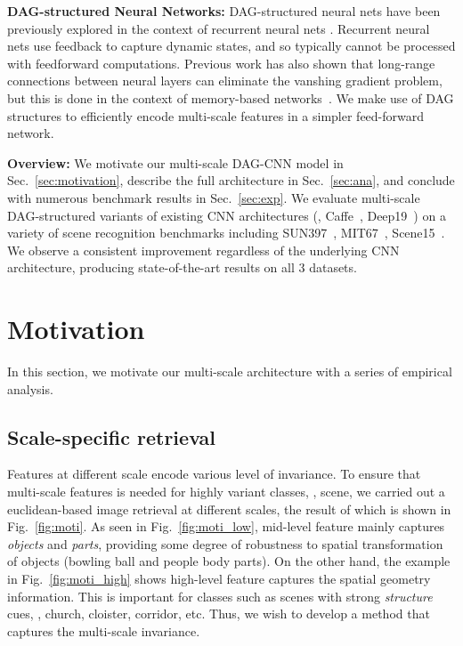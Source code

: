 \documentclass[10pt,twocolumn,letterpaper]{article}
\begin{document}
{\bf DAG-structured Neural Networks:} DAG-structured neural nets have been previously explored in the context of recurrent neural nets \cite{baldi2003principled,graves2009offline}. Recurrent neural nets use feedback to capture dynamic states, and so typically cannot be processed with feedforward computations. Previous work has also shown that long-range connections between neural layers can eliminate the vanshing gradient problem, but this is done in the context of memory-based networks~\cite{hochreiter1997long}. We make use of DAG structures to efficiently encode multi-scale features in a simpler feed-forward network.

{\bf Overview:} We motivate our multi-scale DAG-CNN model in Sec.~\ref{sec:motivation}, describe the full architecture in Sec.~\ref{sec:ana}, and conclude with numerous benchmark results in Sec.~\ref{sec:exp}. We evaluate multi-scale DAG-structured variants of existing CNN architectures (\eg, Caffe~\cite{Caffe}, Deep19~\cite{veryDeep}) on a variety of scene recognition benchmarks including SUN397~\cite{SUN397}, MIT67~\cite{MIT67}, Scene15~\cite{Scene15}. We observe a consistent improvement regardless of the underlying CNN architecture, producing state-of-the-art results on all 3 datasets.



\section{Motivation\label{sec:motivation}}

In this section, we motivate our multi-scale architecture with a series of empirical analysis. 

\subsection{Scale-specific retrieval} Features at different scale encode various level of invariance. To ensure that multi-scale features is needed for highly variant classes, \eg, scene, we carried out a euclidean-based image retrieval at different scales, the result of which is shown in Fig.~\ref{fig:moti}. As seen in Fig.~\ref{fig:moti_low}, mid-level feature mainly captures \textit{objects} and \textit{parts}, providing some degree of robustness to spatial transformation of objects (bowling ball and people body parts). On the other hand, the example in Fig.~\ref{fig:moti_high} shows high-level feature captures the spatial geometry information. This is important for classes such as scenes with strong \textit{structure} cues, \eg, church, cloister, corridor, etc. Thus, we wish to develop a method that captures the multi-scale invariance.
\end{document}
